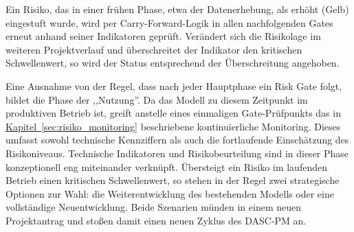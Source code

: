 Ein Risiko, das in einer frühen Phase, etwa der Datenerhebung, 
als erhöht (Gelb) eingestuft wurde, wird per  Carry-Forward-Logik 
in allen nachfolgenden Gates erneut anhand seiner Indikatoren geprüft. 
Verändert sich die Risikolage im weiteren Projektverlauf und überschreitet der Indikator den 
kritischen Schwellenwert, so wird der Status entsprechend der Überschreitung angehoben. 

Eine Ausnahme von der Regel, dass nach jeder Hauptphase ein Risk Gate folgt, 
bildet die Phase der ,,Nutzung''. Da das Modell zu diesem Zeitpunkt im 
produktiven Betrieb ist, greift anstelle eines einmaligen Gate-Prüfpunkts 
das in \hyperref[sec:risiko_monitoring]{Kapitel~\ref{sec:risiko_monitoring}} beschriebene kontinuierliche Monitoring. Dieses umfasst
sowohl technische Kennziffern als auch die fortlaufende Einschätzung des 
Risikoniveaus. Technische Indikatoren und Risikobeurteilung sind in dieser 
Phase konzeptionell eng miteinander verknüpft. Übersteigt ein Risiko im 
laufenden Betrieb einen kritischen Schwellenwert, so stehen in der Regel 
zwei strategische Optionen zur Wahl: die Weiterentwicklung des bestehenden 
Modells oder eine vollständige Neuentwicklung. Beide Szenarien münden in 
einem neuen Projektantrag und stoßen damit einen neuen Zyklus des DASC-PM an.